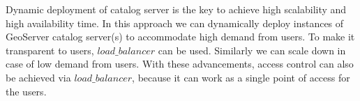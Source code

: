 \par Dynamic deployment of catalog server is the key to achieve high scalability and high availability time. In this approach we can dynamically deploy instances of GeoServer catalog server(s) to accommodate high demand from users. To make it transparent to users, $load\_balancer$ can be used. Similarly we can scale down in case of low demand from users. With these advancements, access control can also be achieved via $load\_balancer$, because it can work as a single point of access for the users. 